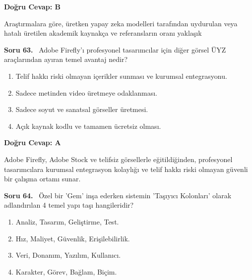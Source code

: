 \documentclass[11pt,a4paper,openany]{book}
\begin{document}
\vspace{4pt}
\begin{tcolorbox}[title=Cevap ve Açıklama, colback=gray!3!white, colframe=primarycolor!90!black, arc=2mm, fonttitle=\bfseries\sffamily, top=6pt, bottom=6pt]
    \textbf{Doğru Cevap: B}

    \vspace{2pt}
    Araştırmalara göre, üretken yapay zeka modelleri tarafından uydurulan veya hatalı üretilen akademik kaynakça ve referansların oranı yaklaşık %
\end{tcolorbox}
\vspace{10pt}
\needspace{5cm}
\vspace{8pt}
\noindent\textbf{\large\sffamily Soru 63.} \ Adobe Firefly'ı profesyonel tasarımcılar için diğer görsel ÜYZ araçlarından ayıran temel avantaj nedir?

\begin{enumerate}[label=\Alph*), leftmargin=25pt, topsep=4pt, itemsep=2pt]
        \item Telif hakkı riski olmayan içerikler sunması ve kurumsal entegrasyonu.
        \item Sadece metinden video üretmeye odaklanması.
        \item Sadece soyut ve sanatsal görseller üretmesi.
        \item Açık kaynak kodlu ve tamamen ücretsiz olması.
\end{enumerate}

\vspace{4pt}
\begin{tcolorbox}[title=Cevap ve Açıklama, colback=gray!3!white, colframe=primarycolor!90!black, arc=2mm, fonttitle=\bfseries\sffamily, top=6pt, bottom=6pt]
    \textbf{Doğru Cevap: A}

    \vspace{2pt}
    Adobe Firefly, Adobe Stock ve telifsiz görsellerle eğitildiğinden, profesyonel tasarımcılara kurumsal entegrasyon kolaylığı ve telif hakkı riski olmayan güvenli bir çalışma ortamı sunar.
\end{tcolorbox}
\vspace{10pt}
\needspace{5cm}
\vspace{8pt}
\noindent\textbf{\large\sffamily Soru 64.} \ Özel bir 'Gem' inşa ederken sistemin 'Taşıyıcı Kolonları' olarak adlandırılan 4 temel yapı taşı hangileridir?

\begin{enumerate}[label=\Alph*), leftmargin=25pt, topsep=4pt, itemsep=2pt]
        \item Analiz, Tasarım, Geliştirme, Test.
        \item Hız, Maliyet, Güvenlik, Erişilebilirlik.
        \item Veri, Donanım, Yazılım, Kullanıcı.
        \item Karakter, Görev, Bağlam, Biçim.
\end{enumerate}
\end{document}
